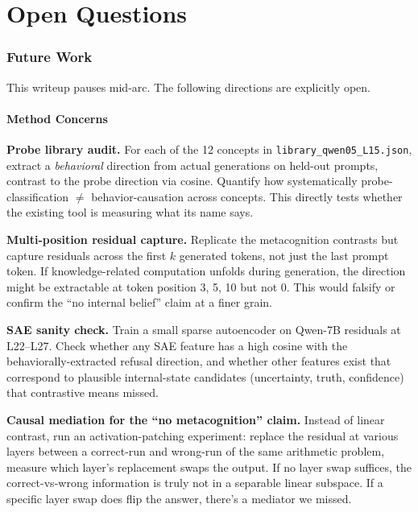 \documentclass[11pt,a4paper]{article}
\begin{document}
\part{Open Questions}

\section{Future Work}

This writeup pauses mid-arc. The following directions are explicitly open.

\subsection{Method Concerns}

\textbf{Probe library audit.} For each of the 12 concepts in \texttt{library\_qwen05\_L15.json}, extract a \emph{behavioral} direction from actual generations on held-out prompts, contrast to the probe direction via cosine. Quantify how systematically probe-classification $\neq$ behavior-causation across concepts. This directly tests whether the existing tool is measuring what its name says.

\textbf{Multi-position residual capture.} Replicate the metacognition contrasts but capture residuals across the first $k$ generated tokens, not just the last prompt token. If knowledge-related computation unfolds during generation, the direction might be extractable at token position 3, 5, 10 but not 0. This would falsify or confirm the ``no internal belief'' claim at a finer grain.

\textbf{SAE sanity check.} Train a small sparse autoencoder on Qwen-7B residuals at L22--L27. Check whether any SAE feature has a high cosine with the behaviorally-extracted refusal direction, and whether other features exist that correspond to plausible internal-state candidates (uncertainty, truth, confidence) that contrastive means missed.

\textbf{Causal mediation for the ``no metacognition'' claim.} Instead of linear contrast, run an activation-patching experiment: replace the residual at various layers between a correct-run and wrong-run of the same arithmetic problem, measure which layer's replacement swaps the output. If no layer swap suffices, the correct-vs-wrong information is truly not in a separable linear subspace. If a specific layer swap does flip the answer, there's a mediator we missed.
\end{document}
